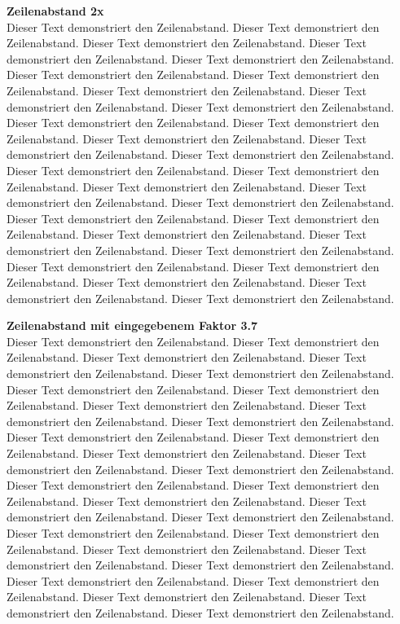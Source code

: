 \documentclass{article}
\begin{document}
  \doublespacing
  \textbf{Zeilenabstand 2x} \\
  Dieser Text demonstriert den Zeilenabstand. Dieser Text demonstriert den Zeilenabstand. Dieser Text demonstriert den Zeilenabstand. Dieser Text demonstriert den Zeilenabstand. Dieser Text demonstriert den Zeilenabstand. Dieser Text demonstriert den Zeilenabstand. Dieser Text demonstriert den Zeilenabstand. Dieser Text demonstriert den Zeilenabstand. Dieser Text demonstriert den Zeilenabstand. Dieser Text demonstriert den Zeilenabstand. Dieser Text demonstriert den Zeilenabstand. Dieser Text demonstriert den Zeilenabstand. Dieser Text demonstriert den Zeilenabstand. Dieser Text demonstriert den Zeilenabstand. Dieser Text demonstriert den Zeilenabstand. Dieser Text demonstriert den Zeilenabstand. Dieser Text demonstriert den Zeilenabstand. Dieser Text demonstriert den Zeilenabstand. Dieser Text demonstriert den Zeilenabstand. Dieser Text demonstriert den Zeilenabstand. Dieser Text demonstriert den Zeilenabstand. Dieser Text demonstriert den Zeilenabstand. Dieser Text demonstriert den Zeilenabstand. Dieser Text demonstriert den Zeilenabstand. Dieser Text demonstriert den Zeilenabstand. Dieser Text demonstriert den Zeilenabstand. Dieser Text demonstriert den Zeilenabstand. Dieser Text demonstriert den Zeilenabstand. Dieser Text demonstriert den Zeilenabstand. Dieser Text demonstriert den Zeilenabstand.

  \textbf{Zeilenabstand mit eingegebenem Faktor 3.7} \\
  Dieser Text demonstriert den Zeilenabstand. Dieser Text demonstriert den Zeilenabstand. Dieser Text demonstriert den Zeilenabstand. Dieser Text demonstriert den Zeilenabstand. Dieser Text demonstriert den Zeilenabstand. Dieser Text demonstriert den Zeilenabstand. Dieser Text demonstriert den Zeilenabstand. Dieser Text demonstriert den Zeilenabstand. Dieser Text demonstriert den Zeilenabstand. Dieser Text demonstriert den Zeilenabstand. Dieser Text demonstriert den Zeilenabstand. Dieser Text demonstriert den Zeilenabstand. Dieser Text demonstriert den Zeilenabstand. Dieser Text demonstriert den Zeilenabstand. Dieser Text demonstriert den Zeilenabstand. Dieser Text demonstriert den Zeilenabstand. Dieser Text demonstriert den Zeilenabstand. Dieser Text demonstriert den Zeilenabstand. Dieser Text demonstriert den Zeilenabstand. Dieser Text demonstriert den Zeilenabstand. Dieser Text demonstriert den Zeilenabstand. Dieser Text demonstriert den Zeilenabstand. Dieser Text demonstriert den Zeilenabstand. Dieser Text demonstriert den Zeilenabstand. Dieser Text demonstriert den Zeilenabstand. Dieser Text demonstriert den Zeilenabstand. Dieser Text demonstriert den Zeilenabstand. Dieser Text demonstriert den Zeilenabstand. Dieser Text demonstriert den Zeilenabstand. Dieser Text demonstriert den Zeilenabstand.
\end{document}
